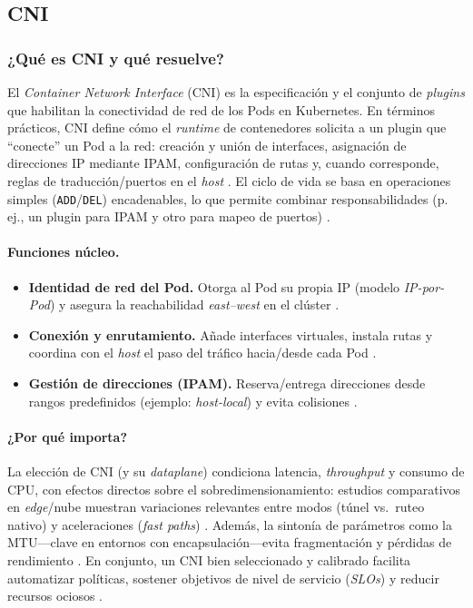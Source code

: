 \documentclass[journal]{IEEEtran}
\begin{document}
\subsection{CNI}

\subsubsection{¿Qué es CNI y qué resuelve?}

El \emph{Container Network Interface} (CNI) es la especificación y el conjunto de \emph{plugins} que habilitan la conectividad de red de los Pods en Kubernetes. En términos prácticos, CNI define cómo el \emph{runtime} de contenedores solicita a un plugin que “conecte” un Pod a la red: creación y unión de interfaces, asignación de direcciones IP mediante IPAM, configuración de rutas y, cuando corresponde, reglas de traducción/puertos en el \emph{host} \cite{ref18,ref4,ref21,ref20}. El ciclo de vida se basa en operaciones simples (\texttt{ADD}/\texttt{DEL}) encadenables, lo que permite combinar responsabilidades (p.\,ej., un plugin para IPAM y otro para mapeo de puertos) \cite{ref18,ref21,ref20}.

\paragraph{Funciones núcleo.}
\begin{itemize}
  \item \textbf{Identidad de red del Pod.} Otorga al Pod su propia IP (modelo \emph{IP-por-Pod}) y asegura la reachabilidad \emph{east--west} en el clúster \cite{ref2}.
  \item \textbf{Conexión y enrutamiento.} Añade interfaces virtuales, instala rutas y coordina con el \emph{host} el paso del tráfico hacia/desde cada Pod \cite{ref18,ref4}.
  \item \textbf{Gestión de direcciones (IPAM).} Reserva/entrega direcciones desde rangos predefinidos (ejemplo: \emph{host-local}) y evita colisiones \cite{ref20,ref18}.
\end{itemize}



\paragraph{¿Por qué importa?}
La elección de CNI (y su \emph{dataplane}) condiciona latencia, \emph{throughput} y consumo de CPU, con efectos directos sobre el sobredimensionamiento: estudios comparativos en \emph{edge}/nube muestran variaciones relevantes entre modos (túnel vs.\ ruteo nativo) y aceleraciones (\emph{fast paths}) \cite{ref7,ref8,ref11,ref22}. Además, la sintonía de parámetros como la MTU—clave en entornos con encapsulación—evita fragmentación y pérdidas de rendimiento \cite{ref12}. En conjunto, un CNI bien seleccionado y calibrado facilita automatizar políticas, sostener objetivos de nivel de servicio (\emph{SLOs}) y reducir recursos ociosos \cite{ref4,ref7,ref8,ref12}.
\end{document}

